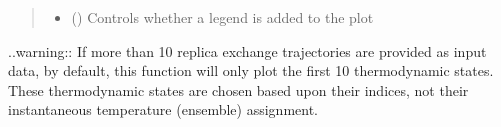 \documentclass[letterpaper,12pt,english,openany,oneside]{sphinxmanual}
\begin{document}
\begin{fulllineitems}
\begin{quote}
\begin{description}
\begin{itemize}
\item {} 
 () \textendash{} Controls whether a legend is added to the plot

\end{itemize}

\end{description}\end{quote}

..warning:: If more than 10 replica exchange trajectories are provided as input data, by default, this function will only plot the first 10 thermodynamic states.  These thermodynamic states are chosen based upon their indices, not their instantaneous temperature (ensemble) assignment.

\end{fulllineitems}

\end{document}
